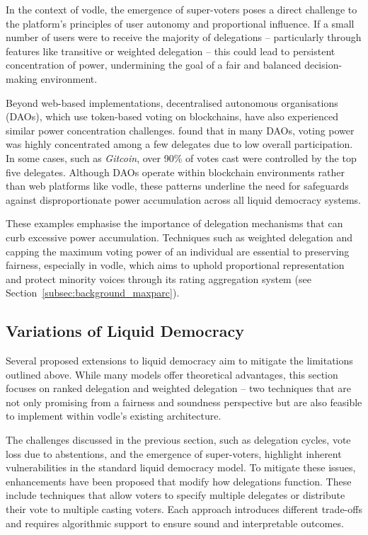 In the context of vodle, the emergence of super-voters poses a direct challenge to the platform's principles of user autonomy and proportional influence. If a small number of users were to receive the majority of delegations -- particularly through features like transitive or weighted delegation -- this could lead to persistent concentration of power, undermining the goal of a fair and balanced decision-making environment.

Beyond web-based implementations, decentralised autonomous organisations (DAOs), which use token-based voting on blockchains, have also experienced similar power concentration challenges. \citet{hallWhatHappensWhen2024} found that in many DAOs, voting power was highly concentrated among a few delegates due to low overall participation. In some cases, such as \textit{Gitcoin}, over 90\% of votes cast were controlled by the top five delegates. Although DAOs operate within blockchain environments rather than web platforms like vodle, these patterns underline the need for safeguards against disproportionate power accumulation across all liquid democracy systems.

These examples emphasise the importance of delegation mechanisms that can curb excessive power accumulation. Techniques such as weighted delegation and capping the maximum voting power of an individual are essential to preserving fairness, especially in vodle, which aims to uphold proportional representation and protect minority voices through its rating aggregation system (see Section~\ref{subsec:background_maxparc}).

\subsection{Variations of Liquid Democracy}
Several proposed extensions to liquid democracy aim to mitigate the limitations outlined above. While many models offer theoretical advantages, this section focuses on ranked delegation and weighted delegation -- two techniques that are not only promising from a fairness and soundness perspective but are also feasible to implement within vodle's existing architecture.

The challenges discussed in the previous section, such as delegation cycles, vote loss due to abstentions, and the emergence of super-voters, highlight inherent vulnerabilities in the standard liquid democracy model. To mitigate these issues, enhancements have been proposed that modify how delegations function. These include techniques that allow voters to specify multiple delegates or distribute their vote to multiple casting voters. Each approach introduces different trade-offs and requires algorithmic support to ensure sound and interpretable outcomes.

